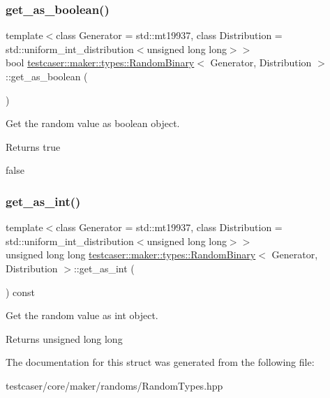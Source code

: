 \subsubsection{\texorpdfstring{get\+\_\+as\+\_\+boolean()}{get\_as\_boolean()}}
{\footnotesize\ttfamily template$<$class Generator = std\+::mt19937, class Distribution = std\+::uniform\+\_\+int\+\_\+distribution$<$unsigned long long$>$$>$ \\
bool \hyperlink{structtestcaser_1_1maker_1_1types_1_1RandomBinary}{testcaser\+::maker\+::types\+::\+Random\+Binary}$<$ Generator, Distribution $>$\+::get\+\_\+as\+\_\+boolean (\begin{DoxyParamCaption}{ }\end{DoxyParamCaption})\hspace{0.3cm}{\ttfamily [inline]}}



Get the random value as boolean object. 

\begin{DoxyReturn}{Returns}
true 

false 
\end{DoxyReturn}
\mbox{\label{structtestcaser_1_1maker_1_1types_1_1RandomBinary_a40519ce9d13d4e3681d4eeada57fbfb2}} 
\subsubsection{\texorpdfstring{get\+\_\+as\+\_\+int()}{get\_as\_int()}}
{\footnotesize\ttfamily template$<$class Generator = std\+::mt19937, class Distribution = std\+::uniform\+\_\+int\+\_\+distribution$<$unsigned long long$>$$>$ \\
unsigned long long \hyperlink{structtestcaser_1_1maker_1_1types_1_1RandomBinary}{testcaser\+::maker\+::types\+::\+Random\+Binary}$<$ Generator, Distribution $>$\+::get\+\_\+as\+\_\+int (\begin{DoxyParamCaption}{ }\end{DoxyParamCaption}) const\hspace{0.3cm}{\ttfamily [inline]}}



Get the random value as int object. 

\begin{DoxyReturn}{Returns}
unsigned long long 
\end{DoxyReturn}


The documentation for this struct was generated from the following file\+:\begin{DoxyCompactItemize}
\item 
testcaser/core/maker/randoms/Random\+Types.\+hpp\end{DoxyCompactItemize}

